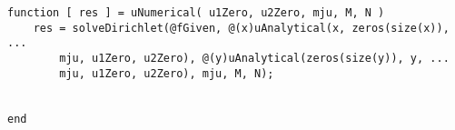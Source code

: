 \documentclass[11pt, oneside, final]{article}
\begin{document}
    \begin{verbatim}
function [ res ] = uNumerical( u1Zero, u2Zero, mju, M, N )
    res = solveDirichlet(@fGiven, @(x)uAnalytical(x, zeros(size(x)), ...
        mju, u1Zero, u2Zero), @(y)uAnalytical(zeros(size(y)), y, ...
        mju, u1Zero, u2Zero), mju, M, N);
    

end


        \end{verbatim}
    
\end{document}
